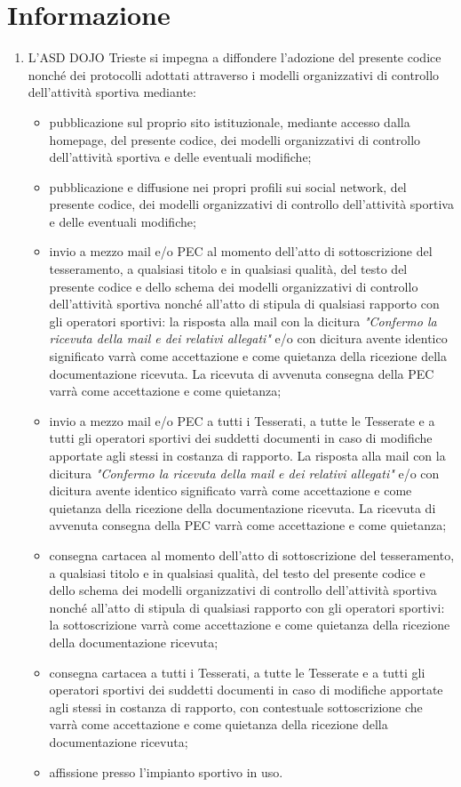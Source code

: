 \documentclass{djtsasddoc}
\begin{document}
	\section{Informazione}
	\begin{enumerate}
		\item L'ASD DOJO Trieste si impegna a diffondere l'adozione del presente codice nonché dei protocolli adottati attraverso i modelli organizzativi di controllo dell'attività sportiva mediante:
		\begin{itemize}
			\item pubblicazione sul proprio sito istituzionale, mediante accesso dalla homepage, del presente	codice, dei modelli organizzativi di controllo dell'attività sportiva e delle eventuali modifiche;
			\item pubblicazione e diffusione nei propri profili sui social network, del presente codice, dei	modelli organizzativi di controllo dell'attività sportiva e delle eventuali modifiche;
			\item invio a mezzo mail e/o PEC al momento dell'atto di sottoscrizione del tesseramento, a	qualsiasi titolo e in qualsiasi qualità, del testo del presente codice e dello schema dei modelli	organizzativi di controllo dell'attività sportiva nonché all'atto di stipula di qualsiasi rapporto	con gli operatori sportivi: la risposta alla mail con la dicitura \textit{"Confermo la ricevuta della mail e dei relativi allegati"} e/o con dicitura avente identico significato varrà come accettazione e	come quietanza della ricezione della documentazione ricevuta. La ricevuta di avvenuta	consegna della PEC varrà come accettazione e come quietanza;
			\item invio a mezzo mail e/o PEC a tutti i Tesserati, a tutte le Tesserate e a tutti gli operatori sportivi dei suddetti documenti in caso di modifiche apportate agli stessi in costanza di	rapporto. La risposta alla mail con la dicitura \textit{"Confermo la ricevuta della mail e dei relativi allegati"} e/o con dicitura avente identico significato varrà come accettazione e come quietanza della ricezione della documentazione ricevuta. La ricevuta di avvenuta consegna della PEC varrà come accettazione e come quietanza;
			\item consegna cartacea al momento dell'atto di sottoscrizione del tesseramento, a qualsiasi titolo e in qualsiasi qualità, del testo del presente codice e dello schema dei modelli organizzativi di 	controllo dell'attività sportiva nonché all'atto di stipula di qualsiasi rapporto con gli operatori 	sportivi: la sottoscrizione varrà come accettazione e come quietanza della ricezione della 	documentazione ricevuta;
			\item consegna cartacea a tutti i Tesserati, a tutte le Tesserate e a tutti gli operatori sportivi dei	suddetti documenti in caso di modifiche apportate agli stessi in costanza di rapporto, con	contestuale sottoscrizione che varrà come accettazione e come quietanza della ricezione della 	documentazione ricevuta;
			\item affissione presso l'impianto sportivo in uso.
		\end{itemize}
	\end{enumerate}
	
\end{document}
